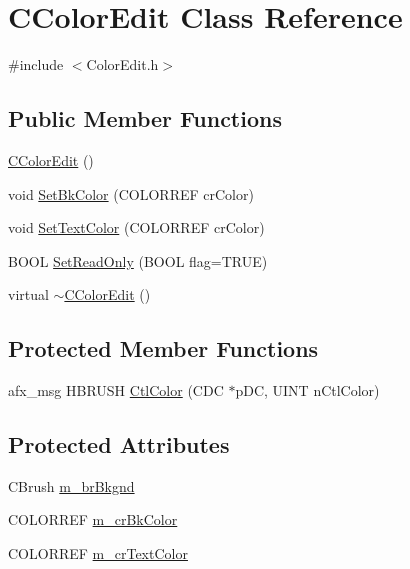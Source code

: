 \hypertarget{classCColorEdit}{
\section{CColorEdit Class Reference}
\label{classCColorEdit}
}


{\ttfamily \#include $<$ColorEdit.h$>$}

\subsection*{Public Member Functions}
\begin{DoxyCompactItemize}
\item 
\hyperlink{classCColorEdit_a6e3148050730c94d5e87b0298962d925}{CColorEdit} ()
\item 
void \hyperlink{classCColorEdit_af984a10c41a06ceec6cf8ee0fd1cee50}{SetBkColor} (COLORREF crColor)
\item 
void \hyperlink{classCColorEdit_ab0fe341e9e668f9e5951c46ffd2f80bc}{SetTextColor} (COLORREF crColor)
\item 
BOOL \hyperlink{classCColorEdit_a6e3a4c7837b3d1f29bbabb929a15c0af}{SetReadOnly} (BOOL flag=TRUE)
\item 
virtual \hyperlink{classCColorEdit_a8df91a3dde935d34fff5138e1ee0290e}{$\sim$CColorEdit} ()
\end{DoxyCompactItemize}
\subsection*{Protected Member Functions}
\begin{DoxyCompactItemize}
\item 
afx\_\-msg HBRUSH \hyperlink{classCColorEdit_a3f1a711ef9846f11f5b7d6c48d4f0bd6}{CtlColor} (CDC $\ast$pDC, UINT nCtlColor)
\end{DoxyCompactItemize}
\subsection*{Protected Attributes}
\begin{DoxyCompactItemize}
\item 
CBrush \hyperlink{classCColorEdit_a2b05402a285e0d62a6a4d289cca51bbe}{m\_\-brBkgnd}
\item 
COLORREF \hyperlink{classCColorEdit_a11eceaa262ad227cdcb2bf8af03e0326}{m\_\-crBkColor}
\item 
COLORREF \hyperlink{classCColorEdit_acaeca1db8546c61a45b3d7dace1ec57a}{m\_\-crTextColor}
\end{DoxyCompactItemize}


